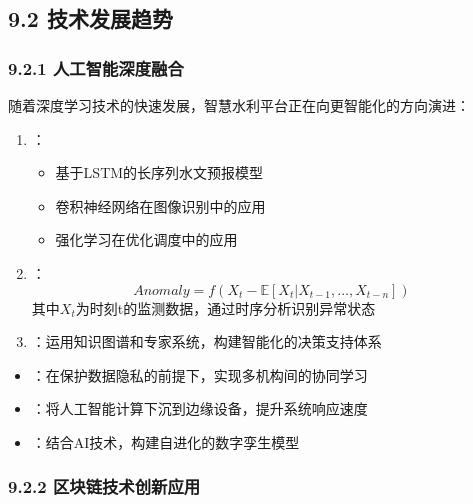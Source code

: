 \hypertarget{ux6280ux672fux53d1ux5c55ux8d8bux52bf}{%
\subsection{9.2 技术发展趋势}\label{ux6280ux672fux53d1ux5c55ux8d8bux52bf}}

\hypertarget{ux4ebaux5de5ux667aux80fdux6df1ux5ea6ux878dux5408}{%
\subsubsection{9.2.1 人工智能深度融合}\label{ux4ebaux5de5ux667aux80fdux6df1ux5ea6ux878dux5408}}


随着深度学习技术的快速发展，智慧水利平台正在向更智能化的方向演进：

\begin{enumerate}
\def\labelenumi{\arabic{enumi}.}
\item
  ：

  \begin{itemize}
  \tightlist
  \item
    基于LSTM的长序列水文预报模型
  \item
    卷积神经网络在图像识别中的应用
  \item
    强化学习在优化调度中的应用
  \end{itemize}
\item
  ： \[Anomaly = f(X_t - \mathbb{E}[X_t|X_{t-1}, ..., X_{t-n}])\] 其中\(X_t\)为时刻t的监测数据，通过时序分析识别异常状态
\item
  ：运用知识图谱和专家系统，构建智能化的决策支持体系
\end{enumerate}


\begin{itemize}
\tightlist
\item
  ：在保护数据隐私的前提下，实现多机构间的协同学习
\item
  ：将人工智能计算下沉到边缘设备，提升系统响应速度
\item
  ：结合AI技术，构建自进化的数字孪生模型
\end{itemize}

\hypertarget{ux533aux5757ux94feux6280ux672fux521bux65b0ux5e94ux7528}{%
\subsubsection{9.2.2 区块链技术创新应用}\label{ux533aux5757ux94feux6280ux672fux521bux65b0ux5e94ux7528}}

